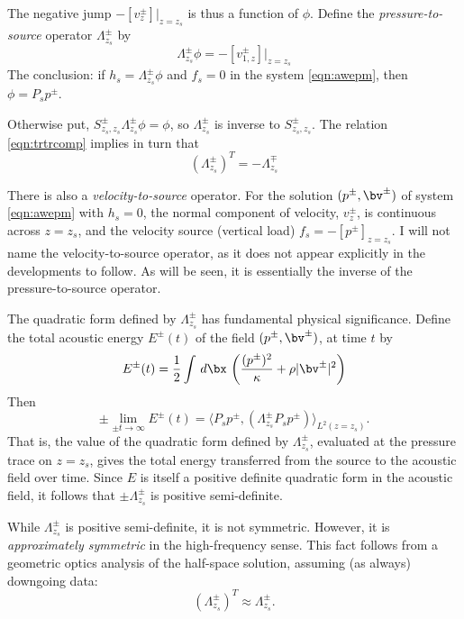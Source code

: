The negative jump $-[v^{\pm}_{z}]|_{z=z_s}$ is thus a function of $\phi$. Define
the {\em pressure-to-source} operator $\Lambda^{\pm}_{z_s}$ by
\begin{equation}
  \label{eqn:deflam}
  \Lambda^{\pm}_{z_s}\phi = -[v^{\pm}_{1,z}]|_{z=z_s}
\end{equation}
The conclusion: if $h_s = \Lambda^{\pm}_{z_s}\phi$ and $f_s=0$ in the
system \ref{eqn:awepm}, then $\phi=P_sp^{\pm}$.

Otherwise put, $S^{\pm}_{z_s,z_s}\Lambda^{\pm}_{z_s} \phi = \phi$, so
$\Lambda^{\pm}_{z_s}$ is inverse to $S^{\pm}_{z_s,z_s}$. The relation
\ref{eqn:trtrcomp} implies in turn that
\begin{equation}
  \label{eqn:lamadj}
  (\Lambda^{\pm}_{z_s})^T = - \Lambda^{\mp}_{z_s}
\end{equation}

There is also a {\em velocity-to-source} operator. For the solution
$(p^{\pm},\bv^{\pm})$ of system \ref{eqn:awepm} with $h_s=0$, the
normal component of velocity, $v^{\pm}_z$, is continuous across
$z=z_s$, and the velocity source (vertical load)
$f_s=-[p^{\pm}]_{z=z_s}$. I will not name the velocity-to-source
operator, as it does not appear explicitly in the developments to
follow. As will be seen, it is essentially the inverse of the
pressure-to-source operator.

The quadratic form defined by $\Lambda^{\pm}_{z_s}$ has fundamental
physical significance. Define the total acoustic energy $E^{\pm}(t)$ of the
field $(p^{\pm},\bv^{\pm})$, at time $t$ by
\begin{equation}
  \label{eqn:defae0}
  E^{\pm}(t) = \frac{1}{2} \int \,d\bx \, \left(\frac{(p^{\pm})^2}{\kappa} + \rho |\bv^{\pm}|^2\right)
\end{equation}
Then
\begin{equation}
  \label{eqn:elim}
  \pm \lim_{\pm t \rightarrow \infty} E^{\pm}(t) =  \langle P_sp^{\pm},
  (\Lambda^{\pm}_{z_s} P_sp^{\pm}) \rangle_{L^2(z=z_s)}.
\end{equation}
That is, the value of the quadratic form defined by
$\Lambda^{\pm}_{z_s}$, evaluated at the pressure trace on $z=z_s$,
gives the total energy transferred from the source to the
acoustic field over time. Since $E$ is itself a positive definite
quadratic form in the acoustic field, it follows that $\pm
\Lambda^{\pm}_{z_s}$ is positive semi-definite. 

While $\Lambda^{\pm}_{z_s}$ is positive semi-definite, it is not
symmetric. However, it is {\em approximately symmetric} in the
high-frequency sense. This fact follows from a
geometric optics analysis of the half-space solution,
assuming (as always) downgoing data:
\begin{equation}
  \label{eqn:lamappsim}
  (\Lambda^{\pm}_{z_s})^T \approx \Lambda^{\pm}_{z_s}.
\end{equation}

